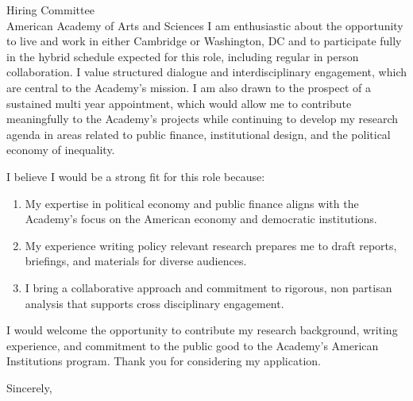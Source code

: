 \documentclass[11pt,letterpaper]{letter}
\begin{document}
\begin{letter}{Hiring Committee \\
American Academy of Arts and Sciences}
I am enthusiastic about the opportunity to live and work in either Cambridge or Washington, DC and to participate fully in the hybrid schedule expected for this role, including regular in person collaboration. I value structured dialogue and interdisciplinary engagement, which are central to the Academy’s mission. I am also drawn to the prospect of a sustained multi year appointment, which would allow me to contribute meaningfully to the Academy’s projects while continuing to develop my research agenda in areas related to public finance, institutional design, and the political economy of inequality.

I believe I would be a strong fit for this role because:
\begin{enumerate}
    \item My expertise in political economy and public finance aligns with the Academy’s focus on the American economy and democratic institutions.
    \item My experience writing policy relevant research prepares me to draft reports, briefings, and materials for diverse audiences.
    \item I bring a collaborative approach and commitment to rigorous, non partisan analysis that supports cross disciplinary engagement.
\end{enumerate}

I would welcome the opportunity to contribute my research background, writing experience, and commitment to the public good to the Academy’s American Institutions program. Thank you for considering my application.

\closing{Sincerely,}

\end{letter}
\end{document}
